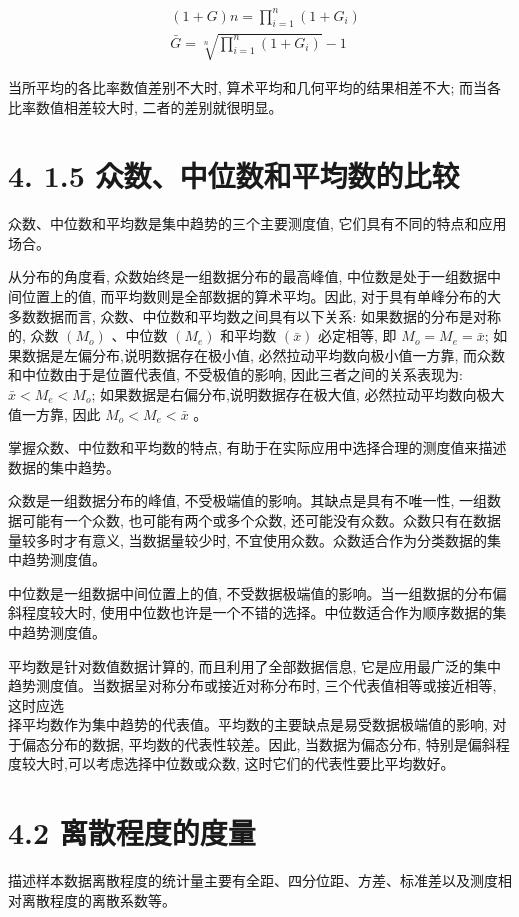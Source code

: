 \documentclass[10pt]{article}
\begin{document}
\begin{CJK*}{UTF8}{bsmi}
\begin{align*}
& (1+G) n=\prod_{i=1}^{n}\left(1+G_{i}\right)  \tag{4.7}\\
& \bar{G}=\sqrt[n]{\prod_{i=1}^{n}\left(1+G_{i}\right)}-1 \tag{4.8}
\end{align*}


当所平均的各比率数值差别不大时, 算术平均和几何平均的结果相差不大; 而当各比率数值相差较大时, 二者的差别就很明显。

\section*{4. 1.5 众数、中位数和平均数的比较}
众数、中位数和平均数是集中趋势的三个主要测度值, 它们具有不同的特点和应用场合。

从分布的角度看, 众数始终是一组数据分布的最高峰值, 中位数是处于一组数据中间位置上的值, 而平均数则是全部数据的算术平均。因此, 对于具有单峰分布的大多数数据而言, 众数、中位数和平均数之间具有以下关系: 如果数据的分布是对称的, 众数 $\left(M_{o}\right)$ 、中位数 $\left(M_{e}\right)$ 和平均数 $(\bar{x})$ 必定相等, 即 $M_{o}=M_{e}=\bar{x}$; 如果数据是左偏分布,说明数据存在极小值, 必然拉动平均数向极小值一方靠, 而众数和中位数由于是位置代表值, 不受极值的影响, 因此三者之间的关系表现为: $\bar{x}<M_{e}<M_{o}$; 如果数据是右偏分布,说明数据存在极大值, 必然拉动平均数向极大值一方靠, 因此 $M_{o}<M_{e}<\bar{x}$ 。

掌握众数、中位数和平均数的特点, 有助于在实际应用中选择合理的测度值来描述数据的集中趋势。

众数是一组数据分布的峰值, 不受极端值的影响。其缺点是具有不唯一性, 一组数据可能有一个众数, 也可能有两个或多个众数, 还可能没有众数。众数只有在数据量较多时才有意义, 当数据量较少时, 不宜使用众数。众数适合作为分类数据的集中趋势测度值。

中位数是一组数据中间位置上的值, 不受数据极端值的影响。当一组数据的分布偏斜程度较大时, 使用中位数也许是一个不错的选择。中位数适合作为顺序数据的集中趋势测度值。

平均数是针对数值数据计算的, 而且利用了全部数据信息, 它是应用最广泛的集中趋势测度值。当数据呈对称分布或接近对称分布时, 三个代表值相等或接近相等, 这时应选\\
择平均数作为集中趋势的代表值。平均数的主要缺点是易受数据极端值的影响, 对于偏态分布的数据, 平均数的代表性较差。因此, 当数据为偏态分布, 特别是偏斜程度较大时,可以考虑选择中位数或众数, 这时它们的代表性要比平均数好。

\section*{4.2 离散程度的度量}
描述样本数据离散程度的统计量主要有全距、四分位距、方差、标准差以及测度相对离散程度的离散系数等。


\end{CJK*}
\end{document}
